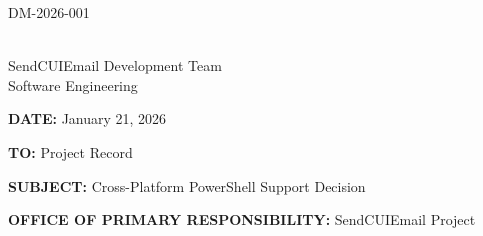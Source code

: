 \documentclass[11pt,letterpaper]{article}
\newcommand{\UniqueID}{DM-2026-001}
\newcommand{\DocumentDate}{January 21, 2026}
\newcommand{\AuthorName}{SendCUIEmail Development Team}
\newcommand{\AuthorTitle}{Software Engineering}
\newcommand{\ToField}{Project Record}
\newcommand{\SubjectField}{Cross-Platform PowerShell Support Decision}
\newcommand{\OPRField}{SendCUIEmail Project}
\begin{document}
\hfill \UniqueID

\vspace{0.25in}

\underline{\hspace{2.5in}}\\[2pt]
\AuthorName\\
\AuthorTitle

\vspace{0.25in}

\textbf{DATE:} \DocumentDate

\textbf{TO:} \ToField

\textbf{SUBJECT:} \SubjectField

\textbf{OFFICE OF PRIMARY RESPONSIBILITY:} \OPRField

\vspace{0.25in}
\end{document}
